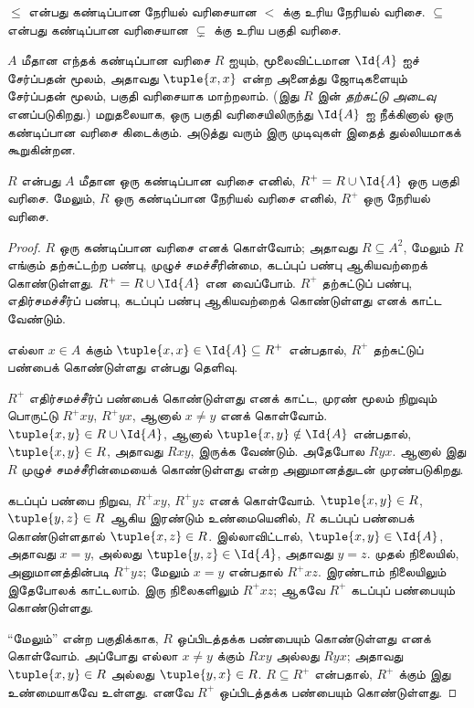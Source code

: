 \documentclass[../../../include/open-logic-section]{subfiles}
\begin{document}
\begin{ex}
$\le$ என்பது கண்டிப்பான நேரியல் வரிசையான $<$ க்கு உரிய நேரியல் வரிசை.
$\subseteq$ என்பது கண்டிப்பான வரிசையான $\subsetneq$ க்கு உரிய பகுதி வரிசை.
\end{ex}

$A$ மீதான எந்தக் கண்டிப்பான வரிசை $R$ ஐயும், மூலைவிட்டமான $\Id{A}$
ஐச் சேர்ப்பதன் மூலம், அதாவது $\tuple{x, x}$ என்ற அனைத்து
ஜோடிகளையும் சேர்ப்பதன் மூலம், பகுதி வரிசையாக மாற்றலாம்.
(இது $R$ இன் \emph{தற்சுட்டு அடைவு} எனப்படுகிறது.)
மறுதலையாக, ஒரு பகுதி வரிசையிலிருந்து $\Id{A}$ ஐ நீக்கினால் ஒரு
கண்டிப்பான வரிசை கிடைக்கும். அடுத்து வரும் இரு முடிவுகள் இதைத்
துல்லியமாகக் கூறுகின்றன.

\begin{prop}
$R$ என்பது $A$ மீதான ஒரு கண்டிப்பான வரிசை எனில்,
$R^+ = R \cup \Id{A}$ ஒரு பகுதி வரிசை. மேலும், $R$ ஒரு கண்டிப்பான
நேரியல் வரிசை எனில், $R^+$ ஒரு நேரியல் வரிசை.
\end{prop}

\begin{proof}
$R$ ஒரு கண்டிப்பான வரிசை எனக் கொள்வோம்; அதாவது $R \subseteq A^2$,
மேலும் $R$ எங்கும் தற்சுட்டற்ற பண்பு, முழுச் சமச்சீரின்மை, கடப்புப் பண்பு
ஆகியவற்றைக் கொண்டுள்ளது. $R^+ = R \cup \Id{A}$ என வைப்போம்.
$R^+$ தற்சுட்டுப் பண்பு, எதிர்சமச்சீர்ப் பண்பு, கடப்புப் பண்பு
ஆகியவற்றைக் கொண்டுள்ளது எனக் காட்ட வேண்டும்.

எல்லா $x \in A$ க்கும் $\tuple{x, x} \in \Id{A} \subseteq
R^+$ என்பதால், $R^+$ தற்சுட்டுப் பண்பைக் கொண்டுள்ளது என்பது தெளிவு.

$R^+$ எதிர்சமச்சீர்ப் பண்பைக் கொண்டுள்ளது எனக் காட்ட, முரண் மூலம்
நிறுவும் பொருட்டு $R^+xy$, $R^+yx$, ஆனால் $x \neq y$ எனக் கொள்வோம்.
$\tuple{x,y} \in R \cup \Id{A}$, ஆனால்
$\tuple{x, y} \notin \Id{A}$ என்பதால்,
$\tuple{x, y} \in R$, அதாவது $Rxy$, இருக்க வேண்டும். அதேபோல
$Ryx$. ஆனால் இது $R$ முழுச் சமச்சீரின்மையைக் கொண்டுள்ளது என்ற
அனுமானத்துடன் முரண்படுகிறது.

கடப்புப் பண்பை நிறுவ, $R^+xy$, $R^+yz$ எனக் கொள்வோம்.
$\tuple{x, y} \in R$, $\tuple{y,z} \in R$ ஆகிய இரண்டும் உண்மையெனில்,
$R$ கடப்புப் பண்பைக் கொண்டுள்ளதால் $\tuple{x, z} \in
R$. இல்லாவிட்டால், $\tuple{x, y} \in
\Id{A}$, அதாவது $x = y$, அல்லது $\tuple{y, z} \in \Id{A}$,
அதாவது $y = z$. முதல் நிலையில், அனுமானத்தின்படி $R^+yz$; மேலும்
$x = y$ என்பதால் $R^+xz$. இரண்டாம் நிலையிலும் இதேபோலக் காட்டலாம்.
இரு நிலைகளிலும் $R^+xz$; ஆகவே $R^+$ கடப்புப் பண்பையும் கொண்டுள்ளது.

“மேலும்” என்ற பகுதிக்காக, $R$ ஒப்பிடத்தக்க பண்பையும் கொண்டுள்ளது
எனக் கொள்வோம். அப்போது எல்லா $x \neq y$ க்கும் $Rxy$ அல்லது $Ryx$;
அதாவது $\tuple{x, y} \in R$ அல்லது $\tuple{y, x} \in R$.
$R \subseteq R^+$ என்பதால், $R^+$ க்கும் இது உண்மையாகவே உள்ளது.
எனவே $R^+$ ஒப்பிடத்தக்க பண்பையும் கொண்டுள்ளது.
\end{proof}
\end{document}
